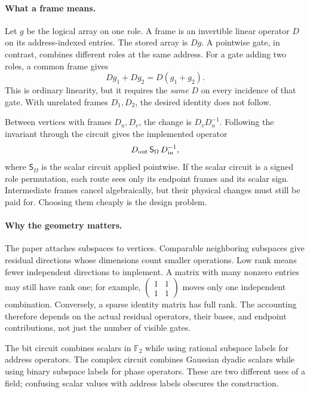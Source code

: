 \paragraph{What a frame means.}
Let $g$ be the logical array on one role. A frame is an invertible linear
operator $D$ on its address-indexed entries. The stored array is $Dg$.
A pointwise gate, in contrast, combines different roles at the same address.
For a gate adding two roles, a common frame gives
\[
 Dg_1+Dg_2=D(g_1+g_2).
\]
This is ordinary linearity, but it requires the \emph{same} $D$ on every
incidence of that gate. With unrelated frames $D_1,D_2$, the desired identity
does not follow.


Between vertices with frames $D_u,D_v$, the change is $D_vD_u^{-1}$.
Following the invariant through the circuit gives the implemented operator
\[
 D_{\rm out}\,\mathsf S_\Omega\,D_{\rm in}^{-1},
\]
where $\mathsf S_\Omega$ is the scalar circuit applied pointwise. If the scalar
circuit is a signed role permutation, each route sees only its endpoint frames
and its scalar sign. Intermediate frames cancel algebraically, but their
physical changes must still be paid for. Choosing them cheaply is the design
problem.

\paragraph{Why the geometry matters.}
The paper attaches subspaces to vertices. Comparable neighboring subspaces
give residual directions whose dimensions count smaller operations. Low rank
means fewer independent directions to implement. A matrix with many nonzero
entries may still have rank one; for example,
$\left(\begin{smallmatrix}1&1\\1&1\end{smallmatrix}\right)$ moves only
one independent combination. Conversely, a sparse identity matrix has full
rank. The accounting therefore depends on the actual residual operators,
their bases, and endpoint contributions, not just the number of visible gates.

The bit circuit combines scalars in $\mathbb F_2$ while using rational
subspace labels for address operators. The complex circuit combines Gaussian
dyadic scalars while using binary subspace labels for phase operators. These
are two different uses of a field; confusing scalar values with address labels
obscures the construction.

